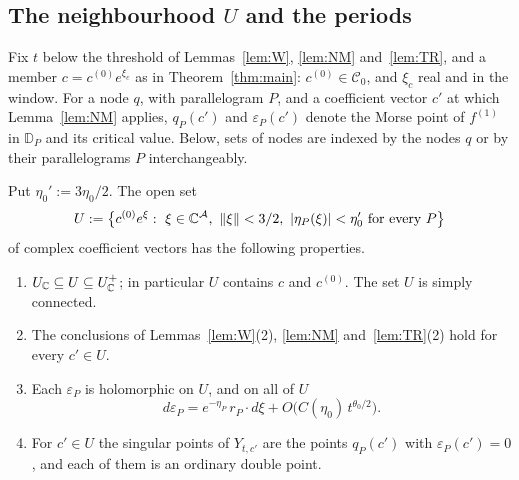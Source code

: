 \subsection{The neighbourhood \texorpdfstring{$U$}{U} and the periods}\label{ssec:U}

Fix $t$ below the threshold of Lemmas~\ref{lem:W}, \ref{lem:NM} and~\ref{lem:TR}, and a member $c=c^{(0)}e^{\xi_c}$ as
in Theorem~\ref{thm:main}: $c^{(0)}\in\mathscr C_0$, and $\xi_c$ real and in the window. For a node $q$, with
parallelogram $P$, and a coefficient vector $c'$ at which Lemma~\ref{lem:NM} applies, $q_P(c')$ and $\varepsilon_P(c')$
denote the Morse point of $f^{(1)}$ in $\mathbb D_P$ and its critical value. Below, sets of nodes are indexed by the
nodes $q$ or by their parallelograms $P$ interchangeably.

\begin{lemma}\label{lem:U}
Put $\eta_0':=3\eta_0/2$. The open set
\[
U:=\bigl\{c^{(0)}e^{\xi}:\ \xi\in\C^{\mathcal A},\ \|\xi\|<3/2,\ |\eta_P(\xi)|<\eta_0'\ \text{for every }P\bigr\}
\]
of complex coefficient vectors has the following properties.
\begin{enumerate}
\item $U_\mathbb C\subseteq U\subseteq U^+_\mathbb C$; in particular $U$ contains $c$ and $c^{(0)}$. The set $U$ is simply connected.
\item The conclusions of Lemmas~\ref{lem:W}(2), \ref{lem:NM} and~\ref{lem:TR}(2) hold for every $c'\in U$.
\item Each $\varepsilon_P$ is holomorphic on $U$, and on all of $U$
\begin{equation}\label{eq:depsilon}
d\varepsilon_P=e^{-\eta_P}\,r_P\cdot d\xi+O\bigl(C(\eta_0)\,t^{\theta_0/2}\bigr).
\end{equation}
\item For $c'\in U$ the singular points of $Y_{t,c'}$ are the points $q_P(c')$ with $\varepsilon_P(c')=0$, and each of
them is an ordinary double point.
\end{enumerate}
\end{lemma}

